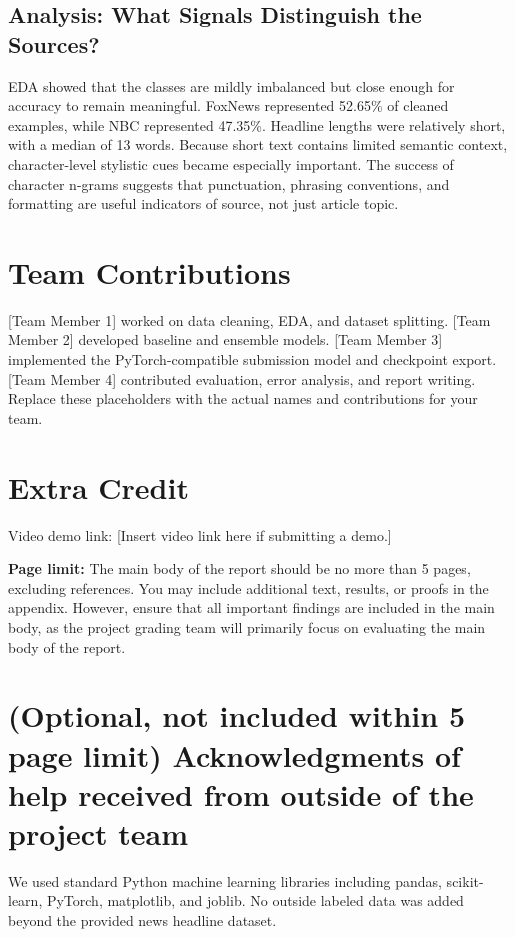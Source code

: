 \documentclass[10pt]{article}
\begin{document}
\subsection{Analysis: What Signals Distinguish the Sources?}
EDA showed that the classes are mildly imbalanced but close enough for accuracy to remain meaningful. FoxNews represented 52.65\% of cleaned examples, while NBC represented 47.35\%. Headline lengths were relatively short, with a median of 13 words. Because short text contains limited semantic context, character-level stylistic cues became especially important. The success of character n-grams suggests that punctuation, phrasing conventions, and formatting are useful indicators of source, not just article topic.

\section{Team Contributions}
[Team Member 1] worked on data cleaning, EDA, and dataset splitting. [Team Member 2] developed baseline and ensemble models. [Team Member 3] implemented the PyTorch-compatible submission model and checkpoint export. [Team Member 4] contributed evaluation, error analysis, and report writing. Replace these placeholders with the actual names and contributions for your team.

\section{Extra Credit}
Video demo link: [Insert video link here if submitting a demo.]

\vspace{3em}
\noindent
{\bf Page limit:} The main body of the report should be no more than 5 pages, excluding references. You may include additional text, results, or proofs in the appendix. However, ensure that all important findings are included in the main body, as the project grading team will primarily focus on evaluating the main body of the report.

\section{(Optional, not included within 5 page limit) Acknowledgments of help received from outside of the project team}
We used standard Python machine learning libraries including pandas, scikit-learn, PyTorch, matplotlib, and joblib. No outside labeled data was added beyond the provided news headline dataset.
\end{document}
